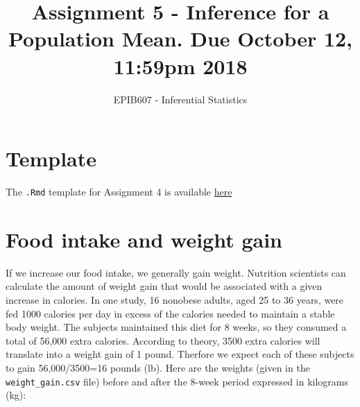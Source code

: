 \documentclass[letterpaper,9pt,twoside,printwatermark=false]{pinp}
\title{Assignment 5 - Inference for a Population Mean. Due October 12, 11:59pm
2018}
\author[a]{EPIB607 - Inferential Statistics}
\affil[a]{Fall 2018, McGill University}
\begin{document}
\verticaladjustment{-2pt}

\maketitle
\thispagestyle{firststyle}



\section*{Template}\label{template}

The \texttt{.Rmd} template for Assignment 4 is available
\href{https://github.com/sahirbhatnagar/EPIB607/raw/master/assignments/a4/a4_template.Rmd}{here}

\section{Food intake and weight gain}\label{food-intake-and-weight-gain}

If we increase our food intake, we generally gain weight. Nutrition
scientists can calculate the amount of weight gain that would be
associated with a given increase in calories. In one study, 16 nonobese
adults, aged 25 to 36 years, were fed 1000 calories per day in excess of
the calories needed to maintain a stable body weight. The subjects
maintained this diet for 8 weeks, so they consumed a total of 56,000
extra calories. According to theory, 3500 extra calories will translate
into a weight gain of 1 pound. Therfore we expect each of these subjects
to gain 56,000/3500=16 pounds (lb). Here are the weights (given in the
\texttt{weight\_gain.csv} file) before and after the 8-week period
expressed in kilograms (kg):
\end{document}
